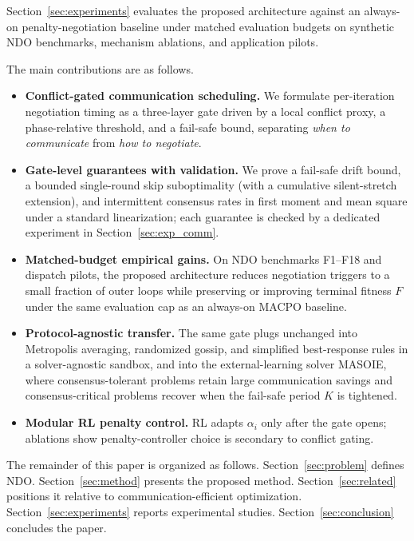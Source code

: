 \documentclass[conference]{IEEEtran}
\begin{document}
Section~\ref{sec:experiments} evaluates the proposed architecture against an always-on penalty-negotiation baseline under matched evaluation budgets on synthetic NDO benchmarks, mechanism ablations, and application pilots.

The main contributions are as follows.
\begin{itemize}
\item \textbf{Conflict-gated communication scheduling.} We formulate per-iteration negotiation timing as a three-layer gate driven by a local conflict proxy, a phase-relative threshold, and a fail-safe bound, separating \emph{when to communicate} from \emph{how to negotiate}.
\item \textbf{Gate-level guarantees with validation.} We prove a fail-safe drift bound, a bounded single-round skip suboptimality (with a cumulative silent-stretch extension), and intermittent consensus rates in first moment and mean square under a standard linearization; each guarantee is checked by a dedicated experiment in Section~\ref{sec:exp_comm}.
\item \textbf{Matched-budget empirical gains.} On NDO benchmarks F1--F18 and dispatch pilots, the proposed architecture reduces negotiation triggers to a small fraction of outer loops while preserving or improving terminal fitness $F$ under the same evaluation cap as an always-on MACPO baseline.
\item \textbf{Protocol-agnostic transfer.} The same gate plugs unchanged into Metropolis averaging, randomized gossip, and simplified best-response rules in a solver-agnostic sandbox, and into the external-learning solver MASOIE, where consensus-tolerant problems retain large communication savings and consensus-critical problems recover when the fail-safe period $K$ is tightened.
\item \textbf{Modular RL penalty control.} RL adapts $\alpha_i$ only after the gate opens; ablations show penalty-controller choice is secondary to conflict gating.
\end{itemize}

The remainder of this paper is organized as follows. Section~\ref{sec:problem} defines NDO. Section~\ref{sec:method} presents the proposed method. Section~\ref{sec:related} positions it relative to communication-efficient optimization. Section~\ref{sec:experiments} reports experimental studies. Section~\ref{sec:conclusion} concludes the paper.
\end{document}
